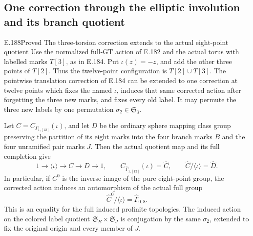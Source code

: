 \subsection{One correction through the elliptic involution and its branch quotient}

\begin{result}{E.188}{Proved}
{The three-torsion correction extends to the actual eight-point quotient}
Use the normalized full-GT action of E.182 and the actual
torus with labelled marks \(T[3]\), as in E.184.
Put \(\iota(z)=-z\), and add the other three points of
\(T[2]\).  Thus the twelve-point configuration is
\(T[2]\cup T[3]\).
The pointwise translation correction of E.184 can be extended
to one correction at twelve points which fixes the named
\(\iota\), induces that same corrected action after forgetting
the three new marks, and fixes every old label.
It may permute the three new labels by one permutation
\(\sigma_2\in\mathfrak S_3\).

Let \(C=C_{\Gamma_{1,[12]}}(\iota)\), and let \(D\) be the
ordinary sphere mapping class group preserving the partition
of its eight marks into the four branch marks \(B\) and the
four unramified pair marks \(J\).  Then the actual quotient
map and its full completion give
\[
 1\longrightarrow\langle\iota\rangle\longrightarrow C
      \longrightarrow D\longrightarrow1,\qquad
 C_{\widehat\Gamma_{1,[12]}}(\iota)=\widehat C,\qquad
 \widehat C/\langle\iota\rangle=\widehat D.
\tag{E.188.1}
\]
In particular, if \(C^0\) is the inverse image of the
pure eight-point group, the corrected action induces an
automorphism of the actual full group
\[
              \widehat C^0/\langle\iota\rangle
                              =\widehat\Gamma_{0,8}.
\tag{E.188.2}
\]
This is an equality for the full induced profinite topologies.
The induced action on the colored label quotient
\(\mathfrak S_B\times\mathfrak S_J\) is conjugation by the
same \(\sigma_2\), extended to fix the original origin
and every member of \(J\).
\end{result}

